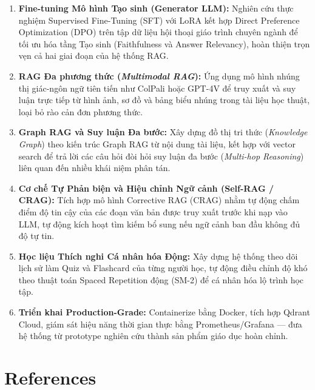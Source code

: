 ﻿\documentclass[12pt]{article}
\begin{document}
\begin{enumerate}
    \item \textbf{Fine-tuning Mô hình Tạo sinh (Generator LLM):} Nghiên cứu thực nghiệm Supervised Fine-Tuning (SFT) với LoRA \cite{hu2022lora} kết hợp Direct Preference Optimization (DPO) \cite{rafailov2023direct} trên tập dữ liệu hội thoại giáo trình chuyên ngành để tối ưu hóa tầng Tạo sinh (Faithfulness và Answer Relevancy), hoàn thiện trọn vẹn cả hai giai đoạn của hệ thống RAG.

    \item \textbf{RAG Đa phương thức (\textit{Multimodal RAG}):} Ứng dụng mô hình nhúng thị giác-ngôn ngữ tiên tiến như ColPali \cite{fevry2024colpali} hoặc GPT-4V để truy xuất và suy luận trực tiếp từ hình ảnh, sơ đồ và bảng biểu nhúng trong tài liệu học thuật, loại bỏ rào cản đơn phương thức.

    \item \textbf{Graph RAG và Suy luận Đa bước:} Xây dựng đồ thị tri thức (\textit{Knowledge Graph}) theo kiến trúc Graph RAG \cite{edge2024graphrag} từ nội dung tài liệu, kết hợp với vector search để trả lời các câu hỏi đòi hỏi suy luận đa bước (\textit{Multi-hop Reasoning}) liên quan đến nhiều khái niệm phân tán.

    \item \textbf{Cơ chế Tự Phản biện và Hiệu chỉnh Ngữ cảnh (Self-RAG / CRAG):} Tích hợp mô hình Corrective RAG (CRAG) \cite{yan2024corrective} nhằm tự động chấm điểm độ tin cậy của các đoạn văn bản được truy xuất trước khi nạp vào LLM, tự động kích hoạt tìm kiếm bổ sung nếu ngữ cảnh ban đầu không đủ độ tự tin.

    \item \textbf{Học liệu Thích nghi Cá nhân hóa Động:} Xây dựng hệ thống theo dõi lịch sử làm Quiz và Flashcard của từng người học, tự động điều chỉnh độ khó theo thuật toán Spaced Repetition động (SM-2) để cá nhân hóa lộ trình học tập.

    \item \textbf{Triển khai Production-Grade:} Containerize bằng Docker, tích hợp Qdrant Cloud, giám sát hiệu năng thời gian thực bằng Prometheus/Grafana --- đưa hệ thống từ prototype nghiên cứu thành sản phẩm giáo dục hoàn chỉnh.
\end{enumerate}


\section{References}
\printbibliography
\end{document}
